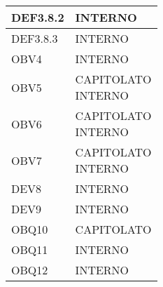 \documentclass{scalatekids-article}
\begin{document}
\begin{longtable}[H]{|p{5.5cm}|p{5.5cm}|}
\hline
DEF3.8.2 & \multiLineCell[t]{INTERNO\\}\\
\hline
DEF3.8.3 & \multiLineCell[t]{INTERNO\\}\\
\hline
OBV4 & \multiLineCell[t]{INTERNO\\}\\
\hline
OBV5 & \multiLineCell[t]{CAPITOLATO\\INTERNO\\}\\
\hline
OBV6 & \multiLineCell[t]{CAPITOLATO\\INTERNO\\}\\
\hline
OBV7 & \multiLineCell[t]{CAPITOLATO\\INTERNO\\}\\
\hline
DEV8 & \multiLineCell[t]{INTERNO\\}\\
\hline
DEV9 & \multiLineCell[t]{INTERNO\\}\\
\hline
OBQ10 & \multiLineCell[t]{CAPITOLATO\\}\\
\hline
OBQ11 & \multiLineCell[t]{INTERNO\\}\\
\hline
OBQ12 & \multiLineCell[t]{INTERNO\\}\\
\hline
\end{longtable}
\newpage
\end{document}
